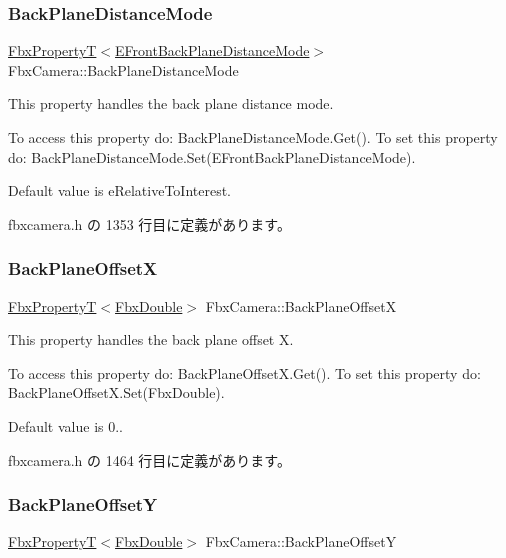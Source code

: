 \subsubsection{\texorpdfstring{Back\+Plane\+Distance\+Mode}{BackPlaneDistanceMode}}
{\footnotesize\ttfamily \hyperlink{class_fbx_property_t}{Fbx\+PropertyT}$<$\hyperlink{class_fbx_camera_a79e74898d117e741c3fbd10b1ef21c79}{E\+Front\+Back\+Plane\+Distance\+Mode}$>$ Fbx\+Camera\+::\+Back\+Plane\+Distance\+Mode}

This property handles the back plane distance mode.

To access this property do\+: Back\+Plane\+Distance\+Mode.\+Get(). To set this property do\+: Back\+Plane\+Distance\+Mode.\+Set(\+E\+Front\+Back\+Plane\+Distance\+Mode).

Default value is e\+Relative\+To\+Interest. 

 fbxcamera.\+h の 1353 行目に定義があります。

\mbox{\label{class_fbx_camera_a2a71f39683269b49b67e007c7d19d67b}} 
\subsubsection{\texorpdfstring{Back\+Plane\+OffsetX}{BackPlaneOffsetX}}
{\footnotesize\ttfamily \hyperlink{class_fbx_property_t}{Fbx\+PropertyT}$<$\hyperlink{fbxtypes_8h_a171e72a1c46fc15c1a6c9c31948c1c5b}{Fbx\+Double}$>$ Fbx\+Camera\+::\+Back\+Plane\+OffsetX}

This property handles the back plane offset X.

To access this property do\+: Back\+Plane\+Offset\+X.\+Get(). To set this property do\+: Back\+Plane\+Offset\+X.\+Set(\+Fbx\+Double).

Default value is 0.. 

 fbxcamera.\+h の 1464 行目に定義があります。

\mbox{\label{class_fbx_camera_abfbc1d3377ed9721492971011fd8f5ed}} 
\subsubsection{\texorpdfstring{Back\+Plane\+OffsetY}{BackPlaneOffsetY}}
{\footnotesize\ttfamily \hyperlink{class_fbx_property_t}{Fbx\+PropertyT}$<$\hyperlink{fbxtypes_8h_a171e72a1c46fc15c1a6c9c31948c1c5b}{Fbx\+Double}$>$ Fbx\+Camera\+::\+Back\+Plane\+OffsetY}

